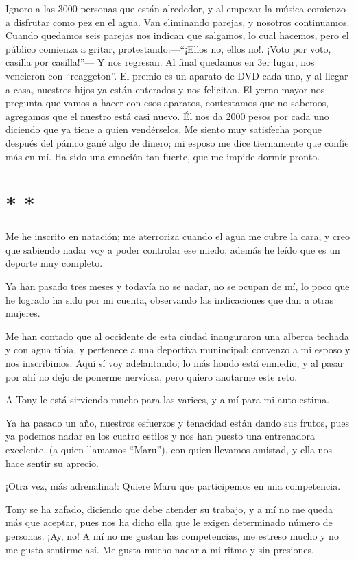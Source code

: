 \documentclass[letterpaper, 12pt]{book}
\begin{document}
Ignoro a las 3000 personas que están alrededor, y al empezar la música comienzo a disfrutar como pez en el agua. Van eliminando parejas, y nosotros continuamos. Cuando quedamos seis parejas nos indican que salgamos, lo cual hacemos, pero el público comienza a gritar, protestando:---``¡Ellos no, ellos no!. ¡Voto por voto, casilla por casilla!''--- Y nos regresan. Al final quedamos en 3er lugar, nos vencieron con ``reaggeton''. El premio es un aparato de DVD cada uno, y al llegar a casa, nuestros hijos ya están enterados y nos felicitan. El yerno mayor nos pregunta que vamos a hacer con esos aparatos, contestamos que no sabemos, agregamos que el nuestro está casi nuevo. Él nos da 2000 pesos por cada uno diciendo que ya tiene a quien vendérselos. Me siento muy satisfecha porque después del pánico gané algo de dinero; mi esposo me dice tiernamente que confíe más en mí. Ha sido una emoción tan fuerte, que me impide dormir pronto.

\section*{\centering * * *}
Me he inscrito en natación; me aterroriza cuando el agua me cubre la cara, y creo que sabiendo nadar voy a poder controlar ese miedo, además he leído que es un deporte muy completo.

Ya han pasado tres meses y todavía no se nadar, no se ocupan de mí, lo poco que he logrado ha sido por mi cuenta, observando las indicaciones que dan a otras mujeres.

Me han contado que al occidente de esta ciudad inauguraron una alberca techada y con agua tibia, y pertenece a una deportiva munincipal; convenzo a mi esposo y nos inscribimos. Aquí sí voy adelantando; lo más hondo está enmedio, y al pasar por ahí no dejo de ponerme nerviosa, pero quiero anotarme este reto.

A Tony le está sirviendo mucho para las varices, y a mí para mi auto-estima.

Ya ha pasado un año, nuestros esfuerzos y tenacidad están dando sus frutos, pues ya podemos nadar en los cuatro estilos y nos han puesto una entrenadora excelente, (a quien llamamos ``Maru''), con quien llevamos amistad, y ella nos hace sentir su aprecio.

¡Otra vez, más adrenalina!: Quiere Maru que participemos en una competencia.

Tony se ha zafado, diciendo que debe atender su trabajo, y a mí no me queda más que aceptar, pues nos ha dicho ella que le exigen determinado número de personas. ¡Ay, no! A mí no me gustan las competencias, me estreso mucho y no me gusta sentirme así. Me gusta mucho nadar a mi ritmo y sin presiones.
\end{document}
